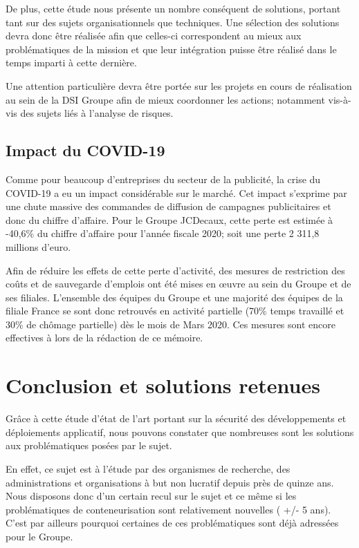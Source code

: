 De plus, cette étude nous présente un nombre conséquent de solutions, portant tant sur des sujets organisationnels que
techniques. Une sélection des solutions devra donc être réalisée afin que celles-ci correspondent au mieux aux problématiques
de la mission et que leur intégration puisse être réalisé dans le temps imparti à cette dernière.

Une attention particulière devra être portée sur les projets en cours de réalisation au sein de la \ac{DSI} Groupe afin de mieux 
coordonner les actions; notamment vis-à-vis des sujets liés à l'analyse de risques. 

\newpage


\subsection{Impact du COVID-19}
Comme pour beaucoup d'entreprises du secteur de la publicité, la crise du COVID-19 a eu un impact considérable sur le
marché. Cet impact s'exprime par une chute massive des commandes de diffusion de campagnes publicitaires et donc du 
chiffre d'affaire.
\newline Pour le Groupe JCDecaux, cette perte est estimée à -40,6\% du chiffre d'affaire pour l'année fiscale 2020; soit
une perte 2 311,8 millions d'euro\autocite{jcdecaux_resultfin_2020}.

Afin de réduire les effets de cette perte d'activité, des mesures de restriction des coûts et de sauvegarde d'emplois 
ont été mises en œuvre au sein du Groupe et de ses filiales. L'ensemble des équipes du Groupe et une majorité des équipes
de la filiale France se sont donc retrouvés en activité partielle (70\% temps travaillé et 30\% de chômage partielle) 
dès le mois de Mars 2020. Ces mesures sont encore effectives à lors de la rédaction de ce mémoire.

\section{Conclusion et solutions retenues}
Grâce à cette étude d'état de l'art portant sur la sécurité des développements et déploiements applicatif, nous pouvons 
constater que nombreuses sont les solutions aux problématiques posées par le sujet. 

En effet, ce sujet est à l'étude par des organismes de recherche, des administrations et organisations à but 
non lucratif depuis près de quinze ans. Nous disposons donc d'un certain recul sur le sujet et ce même si les 
problématiques de conteneurisation sont relativement nouvelles ( +/- 5 ans).
C'est par ailleurs pourquoi certaines de ces problématiques sont déjà adressées pour le Groupe.

